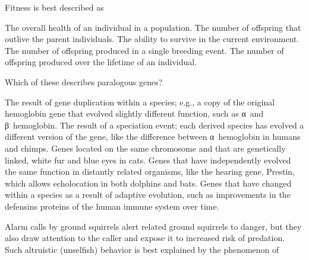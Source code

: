 \documentclass[12pt, addpoints]{exam}
\begin{document}
\begin{questions}
%
%

\newpage

\question[2]
Fitness is best described as

\begin{choices}
\choice The overall health of an individual in a population.
\choice The number of offspring that outlive the parent individuals.
\choice The ability to survive in the current environment.
\choice The number of offspring produced in a single breeding event.
\correctchoice The number of offspring produced over the lifetime of an individual.
\end{choices}


\question[2]
Which of these describes paralogous genes?

\begin{choices}
\correctchoice The result of gene duplication within a species; e.g., a copy of the original hemoglobin gene that evolved slightly different function, such as α~and β~hemoglobin.
\choice The result of a speciation event; each derived species has evolved a different version of the gene, like the difference between α~hemoglobin in humans and chimps.
\choice Genes located on the same chromosome and that are genetically linked, white fur and blue eyes in cats.
\choice Genes that have independently evolved the same function in distantly related organisms, like the hearing gene, Prestin, which allows echolocation in both dolphins and bats.
\choice Genes that have changed within a species as a result of adaptive evolution, such as improvements in the defensins proteins of the human immune system over time.
\end{choices}

\question[2]
Alarm calls by ground squirrels alert related ground squirrels to danger, but they also draw attention to the caller and expose it to increased risk of predation. Such altruistic (unselfish) behavior is best explained by the phenomenon of


\end{questions}
\end{document}
